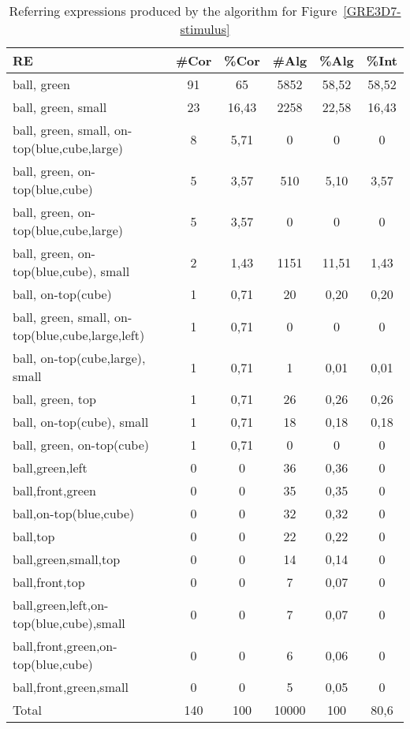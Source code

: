 \begin{table}
\begin{center}
\begin{tabular}{|l|c|c|c|c|c|}
\hline
RE & \#Cor & \%Cor & \#Alg & \%Alg & \%Int \\
\hline
ball, green & 91 & 65 & 5852 &58,52 & 58,52 \\
ball, green, small & 23 & 16,43 & 2258 & 22,58 & 16,43 \\
ball, green, small, on-top(blue,cube,large) & 8 & 5,71 & 0 & 0 & 0 \\
ball, green, on-top(blue,cube) & 5 & 3,57 & 510 & 5,10 & 3,57 \\
ball, green, on-top(blue,cube,large) & 5 & 3,57 & 0 & 0 & 0 \\
ball, green, on-top(blue,cube), small & 2 & 1,43 & 1151 & 11,51 & 1,43 \\
ball, on-top(cube) & 1 & 0,71 & 20 & 0,20 & 0,20 \\
ball, green, small, on-top(blue,cube,large,left) & 1 & 0,71 & 0 & 0 & 0 \\
ball, on-top(cube,large), small	& 1 & 0,71 & 1 & 0,01 & 0,01 \\
ball, green, top & 1 & 0,71 &	26 & 0,26 & 0,26 \\
ball, on-top(cube), small & 1 & 0,71 & 18 & 0,18 & 0,18 \\
ball, green, on-top(cube) & 1 & 0,71 & 0 & 0 & 0 \\
ball,green,left	& 0 & 0 & 36 & 0,36 & 0 \\
ball,front,green & 0 & 0 & 35 & 0,35 & 0 \\
ball,on-top(blue,cube) & 0 & 0 & 32 & 0,32 & 0 \\
ball,top & 0 & 0 & 22 & 0,22 & 0 \\
ball,green,small,top & 0 & 0 & 14 & 0,14 & 0 \\
ball,front,top & 0 & 0 & 7 & 0,07 & 0 \\
ball,green,left,on-top(blue,cube),small & 0 &  0 & 7 & 0,07 & 0 \\
ball,front,green,on-top(blue,cube) & 0 & 0 & 6 & 0,06 & 0 \\
ball,front,green,small & 0 & 0 & 5 & 0,05 & 0 \\
\hline
Total & 140 & 100 & 10000 & 100 & 80,6 \\
\hline
\end{tabular}
\caption{Referring expressions produced by the algorithm for Figure~\ref{GRE3D7-stimulus}\label{results-algo-fig3}}
\end{center}
\end{table}

